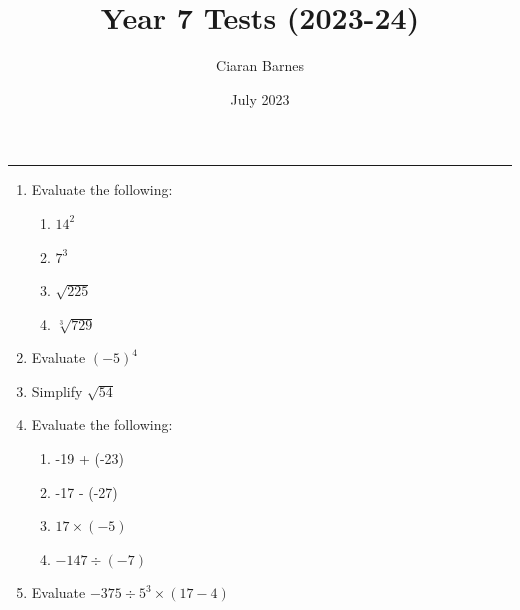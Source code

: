 \documentclass[12pt]{article}
\title{Year 7 Tests (2023-24)}
\author{Ciaran Barnes}
\date{July 2023}
\begin{document}
\maketitle

\newpage
{} 
\medskip
\hrule

\begin{enumerate}
    \item Evaluate the following:
    \vspace{0.5cm}
            \begin{enumerate}
                \item \(14^2\)
                \vspace{3cm}
                \item \(7^3\)
                \vspace{3cm}
                \item \(\sqrt{225}\)
                \vspace{3cm}
                \item \(\sqrt[3]{729}\)
                \vspace{3cm}
            \end{enumerate}
    \hfill %
    \item Evaluate \((-5)^4\)
    \vspace{4cm}
    
    \hfill %
    \item Simplify \(\sqrt{54}\)
    \vspace{3cm}

    \hfill %

    \item Evaluate the following:
    \begin{enumerate}
        \item -19 + (-23)
        \vspace{3cm}
        \item -17 - (-27)
        \vspace{3cm}
        \item \(17 \times (-5) \)
        \vspace{3cm}
        \item \(-147 \div (-7)\)
        \vspace{3cm}

        \hfill %
    \end{enumerate}
    \newpage
    \item Evaluate \(-375 \div 5^3 \times (17 - 4)\)
    \vspace{8cm}

    \hfill %
\end{enumerate}
\end{document}
